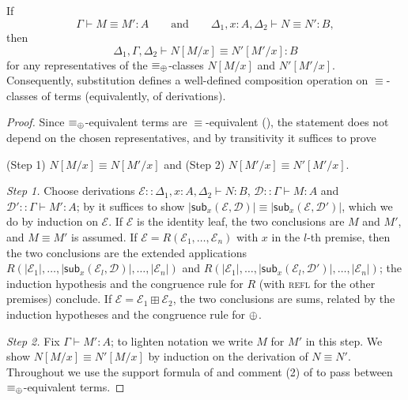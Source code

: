 \begin{proposition}
\label{prop:subst_respects_equiv}
If
\[
\Gamma \vdash M \equiv M' : A
\qquad\text{and}\qquad
\Delta_1, x : A, \Delta_2 \vdash N \equiv N' : B,
\]
then
\[
\Delta_1, \Gamma, \Delta_2 \vdash N[M/x] \equiv N'[M'/x] : B
\]
for any representatives of the $\equiv_{\mathbin{\oplus}}$-classes $N[M/x]$ and $N'[M'/x]$.
Consequently, substitution defines a well-defined composition operation on $\equiv$-classes of terms (equivalently, of derivations).
\end{proposition}
\begin{proof}
Since $\equiv_{\mathbin{\oplus}}$-equivalent terms are $\equiv$-equivalent (), the statement does not depend on the chosen representatives, and by transitivity it suffices to prove
\begin{center}
(Step 1) $N[M/x] \equiv N[M'/x]$
\qquad and \qquad
(Step 2) $N[M'/x] \equiv N'[M'/x]$.
\end{center}

\emph{Step 1.}
Choose derivations $\mathcal{E} :: \Delta_1, x : A, \Delta_2 \vdash N : B$, $\mathcal{D} :: \Gamma \vdash M : A$ and $\mathcal{D}' :: \Gamma \vdash M' : A$; by  it suffices to show $|\mathsf{sub}_x(\mathcal{E}, \mathcal{D})| \equiv |\mathsf{sub}_x(\mathcal{E}, \mathcal{D}')|$, which we do by induction on $\mathcal{E}$.
If $\mathcal{E}$ is the identity leaf, the two conclusions are $M$ and $M'$, and $M \equiv M'$ is assumed.
If $\mathcal{E} = R(\mathcal{E}_1, \ldots, \mathcal{E}_n)$ with $x$ in the $l$-th premise, then the two conclusions are the extended applications
$R(|\mathcal{E}_1|, \ldots, |\mathsf{sub}_x(\mathcal{E}_l, \mathcal{D})|, \ldots, |\mathcal{E}_n|)$
and
$R(|\mathcal{E}_1|, \ldots, |\mathsf{sub}_x(\mathcal{E}_l, \mathcal{D}')|, \ldots, |\mathcal{E}_n|)$;
the induction hypothesis and the congruence rule for $R$ (with \textsc{refl} for the other premises) conclude.
If $\mathcal{E} = \mathcal{E}_1 \boxplus \mathcal{E}_2$, the two conclusions are sums, related by the induction hypotheses and the congruence rule for $\mathbin{\oplus}$.

\emph{Step 2.}
Fix $\Gamma \vdash M' : A$; to lighten notation we write $M$ for $M'$ in this step.
We show $N[M/x] \equiv N'[M/x]$ by induction on the derivation of $N \equiv N'$.
Throughout we use the support formula of  and comment (2) of  to pass between $\equiv_{\mathbin{\oplus}}$-equivalent terms.


\end{proof}
